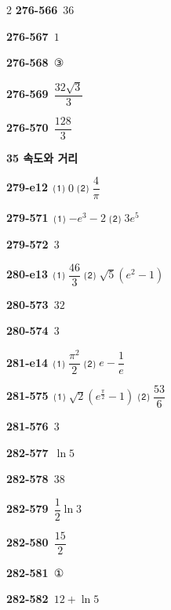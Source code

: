\documentclass[10pt,a4paper]{article}
\begin{document}
\begin{multicols}{2}
\noindent\textbf{276-566}\ $36$\par
\noindent\textbf{276-567}\ $1$\par
\noindent\textbf{276-568}\ ③\par
\noindent\textbf{276-569}\ $\dfrac{32\sqrt{3}}{3}$\par
\noindent\textbf{276-570}\ $\dfrac{128}{3}$\par
\noindent\textbf{35 속도와 거리}\par\smallskip
\noindent\textbf{279-e12}\ ⑴ $0$ ⑵ $\dfrac{4}{\pi}$\par
\noindent\textbf{279-571}\ ⑴ $-e^3-2$ ⑵ $3e^5$\par
\noindent\textbf{279-572}\ $3$\par
\noindent\textbf{280-e13}\ ⑴ $\dfrac{46}{3}$ ⑵ $\sqrt{5}(e^2-1)$\par
\noindent\textbf{280-573}\ $32$\par
\noindent\textbf{280-574}\ $3$\par
\noindent\textbf{281-e14}\ ⑴ $\dfrac{\pi^2}{2}$ ⑵ $e-\dfrac{1}{e}$\par
\noindent\textbf{281-575}\ ⑴ $\sqrt{2}\left(e^{\frac{\pi}{2}}-1\right)$ ⑵ $\dfrac{53}{6}$\par
\noindent\textbf{281-576}\ $3$\par
\noindent\textbf{282-577}\ $\ln 5$\par
\noindent\textbf{282-578}\ $38$\par
\noindent\textbf{282-579}\ $\dfrac{1}{2}\ln 3$\par
\noindent\textbf{282-580}\ $\dfrac{15}{2}$\par
\noindent\textbf{282-581}\ ①\par
\noindent\textbf{282-582}\ $12+\ln 5$\par
\end{multicols}
\end{document}
